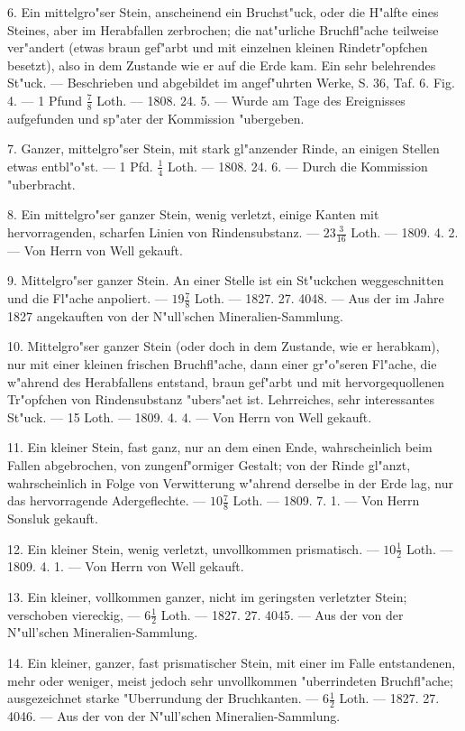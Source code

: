 \documentclass[a4paper, 11pt, oneside, polutonikogreek, german]{article}
\begin{document}
6. Ein mittelgro"ser Stein, anscheinend ein Bruchst"uck, oder die H"alfte eines Steines, aber im Herabfallen zerbrochen; die nat"urliche Bruchfl"ache teilweise ver"andert (etwas braun gef"arbt und mit einzelnen kleinen Rindetr"opfchen besetzt), also in dem Zustande wie er auf die Erde kam. Ein sehr belehrendes St"uck. --- Beschrieben und abgebildet im angef"uhrten Werke, S. 36, Taf. 6. Fig. 4. --- 1 Pfund $\mathfrak{\frac{7}{8}}$ Loth. --- 1808. 24. 5. --- Wurde am Tage des Ereignisses aufgefunden und sp"ater der Kommission "ubergeben.

7. Ganzer, mittelgro"ser Stein, mit stark gl"anzender Rinde, an einigen Stellen etwas entbl"o"st. --- 1 Pfd. $\mathfrak{\frac{1}{4}}$ Loth. --- 1808. 24. 6. --- Durch die Kommission "uberbracht.

8. Ein mittelgro"ser ganzer Stein, wenig verletzt, einige Kanten mit hervorragenden, scharfen Linien von Rindensubstanz. --- $\mathfrak{23\frac{3}{16}}$ Loth. --- 1809. 4. 2. --- Von Herrn von Well gekauft.

9. Mittelgro"ser ganzer Stein. An einer Stelle ist ein St"uckchen weggeschnitten und die Fl"ache anpoliert. --- $\mathfrak{19\frac{7}{8}}$ Loth. --- 1827. 27. 4048. --- Aus der im Jahre 1827 angekauften von der N"ull’schen Mineralien-Sammlung.

10. Mittelgro"ser ganzer Stein (oder doch in dem Zustande, wie er herabkam), nur mit einer kleinen frischen Bruchfl"ache, dann einer gr"o"seren Fl"ache, die w"ahrend des Herabfallens entstand, braun gef"arbt und mit hervorgequollenen Tr"opfchen von Rindensubstanz "ubers"aet ist. Lehrreiches, sehr interessantes St"uck. --- 15 Loth. --- 1809. 4. 4. --- Von Herrn von Well gekauft.

11. Ein kleiner Stein, fast ganz, nur an dem einen Ende, wahrscheinlich beim Fallen abgebrochen, von zungenf"ormiger Gestalt; von der Rinde gl"anzt, wahrscheinlich in Folge von Verwitterung w"ahrend derselbe in der Erde lag, nur das hervorragende Adergeflechte. --- $\mathfrak{10\frac{7}{8}}$ Loth. --- 1809. 7. 1. --- Von Herrn Sonsluk gekauft.

12. Ein kleiner Stein, wenig verletzt, unvollkommen prismatisch. --- $\mathfrak{10\frac{1}{2}}$ Loth. --- 1809. 4. 1. --- Von Herrn von Well gekauft.

13. Ein kleiner, vollkommen ganzer, nicht im geringsten verletzter Stein; verschoben viereckig, --- $\mathfrak{6\frac{1}{2}}$ Loth. --- 1827. 27. 4045. --- Aus der von der N"ull’schen Mineralien-Sammlung.

14. Ein kleiner, ganzer, fast prismatischer Stein, mit einer im Falle entstandenen, mehr oder weniger, meist jedoch sehr unvollkommen "uberrindeten Bruchfl"ache; ausgezeichnet starke "Uberrundung der Bruchkanten. --- $\mathfrak{6\frac{1}{2}}$ Loth. --- 1827. 27. 4046. --- Aus der von der N"ull’schen Mineralien-Sammlung.
\end{document}
